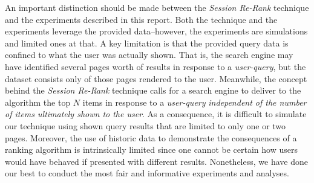 An important distinction should be made between the {\em Session Re-Rank} technique and the experiments described in this report. Both the technique and the experiments leverage the provided data--however, the experiments are simulations and limited ones at that. A key limitation is that the provided query data is confined to what the user was actually shown. That is, the search engine may have identified several pages worth of results in response to a {\em user-query}, but the dataset consists only of those pages rendered to the user. Meanwhile, the concept behind the {\em Session Re-Rank} technique calls for a search engine to deliver to the algorithm the top $N$ items in response to a {\em user-query} {\em independent of the number of items ultimately shown to the user}. As a consequence, it is difficult to simulate our technique using shown query results that are limited to only one or two pages. Moreover, the use of historic data to demonstrate the consequences of a ranking algorithm is intrinsically limited since one cannot be certain how users would have behaved if presented with different results. Nonetheless, we have done our best to conduct the most fair and informative experiments and analyses.




